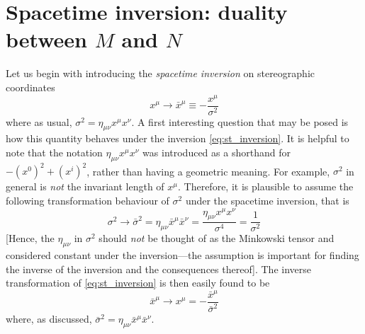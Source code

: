\documentclass[10pt]{article}
\begin{document}
\section{Spacetime inversion: duality between $M$ and $N$}

Let us begin with introducing the \emph{spacetime inversion} on 
stereographic coordinates
%
\begin{equation}
	\label{eq:st_inversion}
	x^\mu \rightarrow \bar{x}^\mu \equiv -\frac{x^\mu}{\sigma^2}
\end{equation}
%
where as usual, $\sigma^2 = \eta_{\mu\nu}x^\mu x^\nu$. A first 
interesting question that may be posed is how this quantity 
behaves under the inversion \eqref{eq:st_inversion}. It is 
helpful to note that the notation $\eta_{\mu\nu}x^\mu x^\nu$ was 
introduced as a shorthand for $-(x^0)^2 + (x^i)^2$, rather than 
having a geometric meaning. For example, $\sigma^2$ in general is 
\emph{not} the invariant length of $x^\mu$. Therefore, it is 
plausible to assume the following transformation behaviour of 
$\sigma^2$ under the spacetime inversion, that is
%
\begin{equation}
	\sigma^2 \rightarrow \bar{\sigma}^2 = \eta_{\mu\nu}\bar{x}^\mu 
	\bar{x}^\nu = \frac{\eta_{\mu\nu}x^\mu x^\nu}{\sigma^4} = 
	\frac{1}{\sigma^2}
\end{equation}
%
[Hence, the $\eta_{\mu\nu}$ in $\sigma^2$ should \emph{not} be 
thought of as the Minkowski tensor and considered constant under 
the inversion---the assumption is important for finding the 
inverse of the inversion and the consequences thereof].
The inverse transformation of \eqref{eq:st_inversion} is then 
easily found to be
%
\begin{equation}
	\label{eq:inv_st_inversion}
	\bar{x}^\mu \rightarrow x^\mu = 
	-\frac{\bar{x}^\mu}{\bar{\sigma}^2}
\end{equation}
%
where, as discussed, $\bar{\sigma}^2 = \eta_{\mu\nu}\bar{x}^\mu 
\bar{x}^\nu$.
\end{document}
